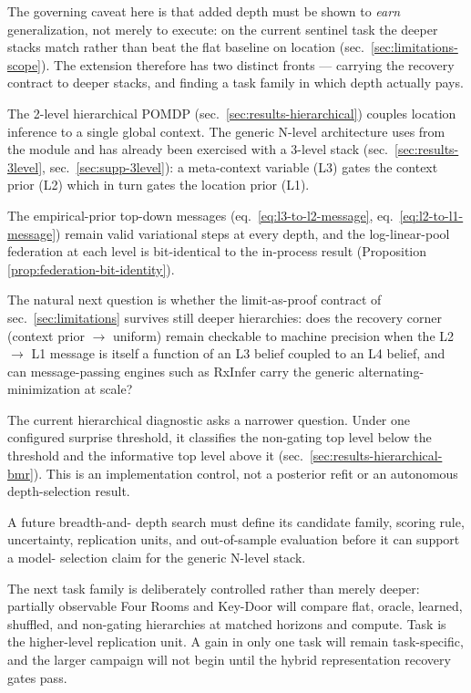 \documentclass[
  english,
]{article}
\theoremstyle{plain}
\theoremstyle{definition}
\theoremstyle{remark}
\theoremstyle{definition}
\begin{document}
The governing caveat here is that added depth must be shown to
\emph{earn} generalization, not merely to execute: on the current
sentinel task the deeper stacks match rather than beat the flat baseline
on location (sec.~\ref{sec:limitations-scope}). The extension therefore
has two distinct fronts --- carrying the recovery contract to deeper
stacks, and finding a task family in which depth actually pays.

The 2-level hierarchical POMDP (sec.~\ref{sec:results-hierarchical})
couples location inference to a single global context. The generic
N-level architecture uses  from the
 module and has already been exercised with a
3-level stack (sec.~\ref{sec:results-3level},
sec.~\ref{sec:supp-3level}): a meta-context variable (L3) gates the
context prior (L2) which in turn gates the location prior (L1).

The empirical-prior top-down messages (eq.~\ref{eq:l3-to-l2-message},
eq.~\ref{eq:l2-to-l1-message}) remain valid variational steps at every
depth, and the log-linear-pool federation at each level is bit-identical
to the in-process result (Proposition
\ref{prop:federation-bit-identity}).

The natural next question is whether the limit-as-proof contract of
sec.~\ref{sec:limitations} survives still deeper hierarchies: does the
recovery corner (context prior \texorpdfstring{\ensuremath{\to}}{->} uniform) remain checkable to machine
precision when the L2 \texorpdfstring{\ensuremath{\to}}{->} L1 message is itself a function of an L3 belief
coupled to an L4 belief, and can message-passing engines such as RxInfer
\citep{bagaev2023rxinfer} carry the generic alternating-minimization at
scale?

The current hierarchical diagnostic asks a narrower question. Under one
configured surprise threshold, it classifies the non-gating top level
below the threshold and the informative top level above it
(sec.~\ref{sec:results-hierarchical-bmr}). This is an implementation
control, not a posterior refit or an autonomous depth-selection result.

A future breadth-and- depth search must define its candidate family,
scoring rule, uncertainty, replication units, and out-of-sample
evaluation before it can support a model- selection claim for the
generic N-level stack.

The next task family is deliberately controlled rather than merely
deeper: partially observable Four Rooms and Key-Door will compare flat,
oracle, learned, shuffled, and non-gating hierarchies at matched
horizons and compute. Task is the higher-level replication unit. A gain
in only one task will remain task-specific, and the larger campaign will
not begin until the hybrid representation recovery gates pass.
\end{document}
